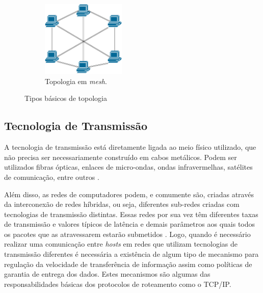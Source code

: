\begin{figure}[t!]
\begin{subfigure}[t]{0.4\textwidth}
	\end{subfigure}
	~
	\begin{subfigure}[t]{0.4\textwidth}
		\centering
		\includegraphics[width=4cm]{./figuras/Topologia-Mesh.pdf} %
	\caption{Topologia em \emph{mesh}.}
	\label{fig_topologia_multiplo_mesh}
	\end{subfigure}
	\caption{Tipos básicos de topologia}
	\label{fig_topologia_multiplo}
\end{figure}

\subsection{Tecnologia de Transmissão}
A tecnologia de transmissão está diretamente ligada ao meio físico utilizado, que não precisa ser necessariamente construído em cabos metálicos. Podem ser utilizados fibras ópticas, enlaces de micro-ondas, ondas infravermelhas, satélites de comunicação, entre outros \cite{Book_Tanenbaum2003}. 

Além disso, as redes de computadores podem, e comumente são, criadas através da interconexão de redes híbridas, ou seja, diferentes sub-redes criadas com tecnologias de transmissão distintas. Essas redes por sua vez têm diferentes taxas de transmissão e valores típicos de latência e demais parâmetros aos quais todos os pacotes que as atravessarem estarão submetidos \cite{Book_Kurose2013}. Logo, quando é necessário realizar uma comunicação entre \emph{hosts} em redes que utilizam tecnologias de transmissão diferentes é necessária a existência de algum tipo de mecanismo para regulação da velocidade de transferência de informação assim como políticas de garantia de entrega dos dados. Estes mecanismos são algumas das responsabilidades básicas dos protocolos de roteamento como o TCP/IP.